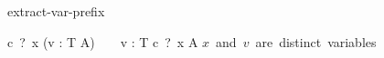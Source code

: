 \begin{circuslaw}{extract-var-prefix}
\begin{circusaction*}
  c~?~x \then (\circvar v : T \circspot A) ~ \equiv ~ \circvar v : T \circspot c~?~x \then A
  \also
  \provided \; \mbox{$x$ and $v$ are distinct variables}
\end{circusaction*}
\end{circuslaw}
